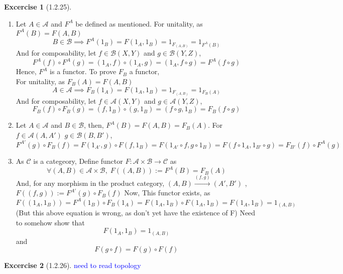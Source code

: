 \documentclass{article}
\theoremstyle{definition}
\newtheorem*{excercise}{Excercise}
\begin{document}
\begin{excercise}[1.2.25] %
		\begin{enumerate}[label=(\alph*)]
			\item Let $A \in \mathcal{A} $ and $F^A$ be defined as mentioned.
				For unitality, as $F^A(B)=F(A,B)$  \[
				B \in \mathcal{B} \implies F^A(1_B)=F(1_A,1_B)=1_{F_{(A,B)}}=1_{F^A(B)}\]
				And for composability, let $f\in \mathcal{B}(X,Y)$ and
				$ g \in \mathcal{B}(Y,Z) $,
				\[F^A(f)\circ F^A(g)=(1_A,f)\circ(1_A,g)=(1_A,f\circ g)=F^A(f\circ g)\]
				Hence, $F^A$ is a functor. To prove $F_B$ a functor, \\
				For unitality, as $F_B(A)=F(A,B)$  \[
				A\in\mathcal{A}\implies F_B(1_A)=F(1_A,1_B)=1_{F_{(A,B)}}=1_{F_B(A)}\]
				And for composability, let $f\in \mathcal{A}(X,Y)$ and
				$ g \in \mathcal{A}(Y,Z) $,
				\[F_B(f) \circ  F_B(g) = (f,1_B) \circ (g,1_B) = (f \circ g,1_B) =F_B(f \circ g) \]
			\item Let  $A \in \mathcal{A} $ and $B \in \mathcal{B} $, then,
				$ F^A (B) = F(A,B) = F_B(A) $.
				For $f \in \mathcal{A}(A,A')$  $g \in\mathcal{B}(B,B')$,
				\[ F^{A'}(g) \circ F_B(f) = F(1_{A'},g) \circ F(f,1_B)
					=F(1_{A'} \circ  f , g \circ 1_B)
					=F(f \circ 1_A,1_{B'} \circ g)
				=F_{B'}(f) \circ  F^A(g)\]
			\item As $\mathcal{C}$ is a categeory,
				Define functor $F:\mathcal{A}\times\mathcal{B}\rightarrow\mathcal{C}$
				as
				\[ \forall (A,B) \in \mathcal{A} \times \mathcal{B},\; F((A,B)):=F^A(B)=F_B(A)\]
				And, for any morphism in the product category,
				$(A,B)\xrightarrow{(f,g)} (A',B')$ ,
				$F((f,g)) := F^{A'}(g) \circ F_B(f)$
				Now, This functor exists, as
				\[F((1_A,1_B))=F^A(1_B) \circ F_B(1_A)=F(1_A,1_B) \circ F(1_A,1_B) = F(1_A,1_B)= 1_{(A,B)} \]
				(But this above equation is wrong, as don't yet have the existence of F)
				Need to somehow show that
				\[ F(1_A,1_B)=1_{(A,B)} \]
				and
				\[ F(g \circ f) = F(g) \circ F(f) \]
		\end{enumerate}
\end{excercise}
\begin{excercise}[1.2.26] %
	\textcolor{blue}{need to read topology}
\end{excercise}
\end{document}
